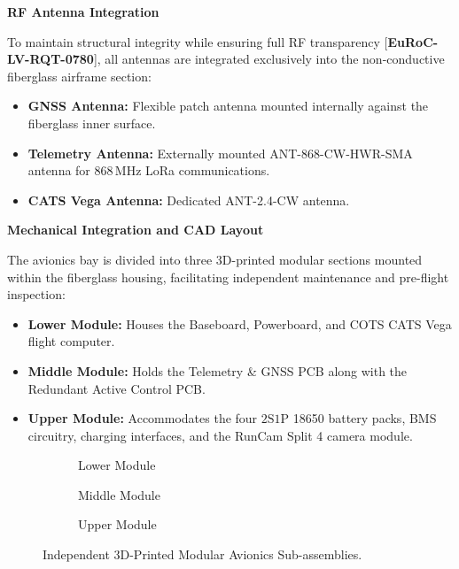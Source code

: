 \documentclass[11pt, a4paper]{article} %
\newcommand{\req}[1]{[\textcolor{EtseNavy}{\textbf{#1}}]}
\begin{document}
\vspace{0.5em}
\noindent\textbf{RF Antenna Integration}

To maintain structural integrity while ensuring full RF transparency \req{EuRoC-LV-RQT-0780}, all antennas are integrated exclusively into the non-conductive fiberglass airframe section:
\begin{itemize}
    \item \textbf{GNSS Antenna:} Flexible patch antenna mounted internally against the fiberglass inner surface.
    \item \textbf{Telemetry Antenna:} Externally mounted ANT-868-CW-HWR-SMA antenna for $868\,\text{MHz}$ LoRa communications.
    \item \textbf{CATS Vega Antenna:} Dedicated ANT-2.4-CW antenna.
\end{itemize}

\vspace{0.5em}
\noindent\textbf{Mechanical Integration and CAD Layout}

The avionics bay is divided into three 3D-printed modular sections mounted within the fiberglass housing, facilitating independent maintenance and pre-flight inspection:
\begin{itemize}
    \item \textbf{Lower Module:} Houses the Baseboard, Powerboard, and COTS CATS Vega flight computer.
    \item \textbf{Middle Module:} Holds the Telemetry \& GNSS PCB along with the Redundant Active Control PCB.
    \item \textbf{Upper Module:} Accommodates the four $2\text{S}1\text{P}$ 18650 battery packs, BMS circuitry, charging interfaces, and the RunCam Split 4 camera module.
\end{itemize}

\begin{figure}[H]
    \centering
    \begin{subfigure}[b]{0.31\textwidth}
        \centering
        \caption{Lower Module}
        \label{fig:lower_module}
    \end{subfigure}
    \hfill
    \begin{subfigure}[b]{0.31\textwidth}
        \centering
        \caption{Middle Module}
        \label{fig:middle_module}
    \end{subfigure}
    \hfill
    \begin{subfigure}[b]{0.31\textwidth}
        \centering
        \caption{Upper Module}
        \label{fig:upper_module}
    \end{subfigure}
    \caption{Independent 3D-Printed Modular Avionics Sub-assemblies.}
    \label{fig:independent_modules}
\end{figure}
\end{document}
